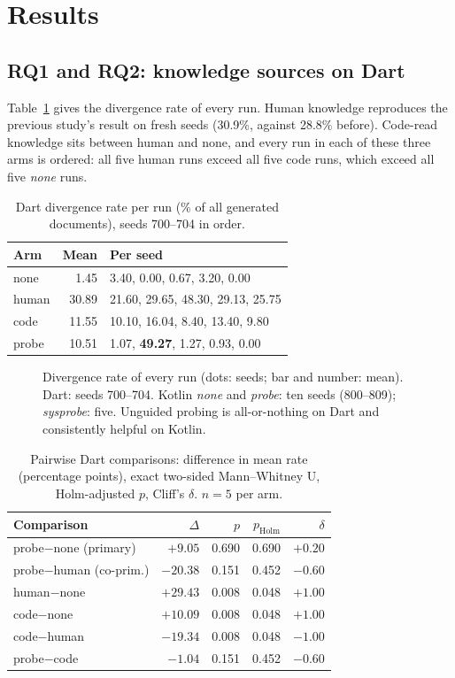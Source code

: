 \section{Results}

\subsection{RQ1 and RQ2: knowledge sources on Dart}

Table~\ref{tab:dart} gives the divergence rate of every run.
Human knowledge reproduces the previous study's result on fresh seeds (30.9\%,
against 28.8\% before). Code-read knowledge sits between human and none, and
every run in each of these three arms is ordered: all five human runs exceed
all five code runs, which exceed all five \emph{none} runs.

\begin{table}[t]
\centering
\caption{Dart divergence rate per run (\% of all generated documents),
seeds 700--704 in order.}
\label{tab:dart}
\begin{tabular}{lrl}
\toprule
Arm & Mean & Per seed \\
\midrule
none  & 1.45  & 3.40, 0.00, 0.67, 3.20, 0.00 \\
human & 30.89 & 21.60, 29.65, 48.30, 29.13, 25.75 \\
code  & 11.55 & 10.10, 16.04, 8.40, 13.40, 9.80 \\
probe & 10.51 & 1.07, \textbf{49.27}, 1.27, 0.93, 0.00 \\
\bottomrule
\end{tabular}
\end{table}

\begin{figure}[t]
\centering

\caption{Divergence rate of every run (dots: seeds; bar and number: mean).
Dart: seeds 700--704. Kotlin \emph{none} and \emph{probe}: ten seeds
(800--809); \emph{sysprobe}: five. Unguided probing is all-or-nothing on
Dart and consistently helpful on Kotlin.}
\label{fig:strip}
\end{figure}

\begin{table}[t]
\centering
\caption{Pairwise Dart comparisons: difference in mean rate (percentage
points), exact two-sided Mann--Whitney U, Holm-adjusted $p$, Cliff's
$\delta$. $n{=}5$ per arm.}
\label{tab:dart-tests}
\begin{tabular}{lrrrr}
\toprule
Comparison & $\Delta$ & $p$ & $p_{\mathrm{Holm}}$ & $\delta$ \\
\midrule
probe$-$none (primary) & $+9.05$  & 0.690 & 0.690 & $+0.20$ \\
probe$-$human (co-prim.) & $-20.38$ & 0.151 & 0.452 & $-0.60$ \\
human$-$none & $+29.43$ & 0.008 & 0.048 & $+1.00$ \\
code$-$none & $+10.09$ & 0.008 & 0.048 & $+1.00$ \\
code$-$human & $-19.34$ & 0.008 & 0.048 & $-1.00$ \\
probe$-$code & $-1.04$  & 0.151 & 0.452 & $-0.60$ \\
\bottomrule
\end{tabular}
\end{table}

